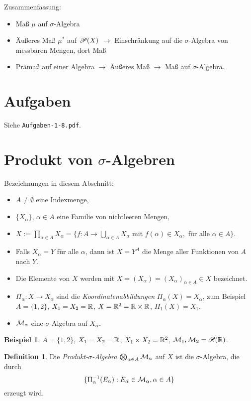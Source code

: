 \documentclass[
 a4paper,
 12pt,
 parskip=half
 ]{scrreprt}
\theoremstyle{plain}
\theoremstyle{definition}
\newtheorem{defn}[thm]{Definition}
\newtheorem*{exmp*}{Beispiel}
\numberwithin{equation}{section}
\begin{document}
Zusammenfassung:
\begin{itemize}
 \item Maß $\mu$ auf $\sigma$-Algebra
 \item Äußeres Maß $\mu^*$ auf $\mathscr{P}(X)$ $\rightarrow$ Einschränkung auf die $\sigma$-Algebra von messbaren Mengen, dort Maß 
 \item Prämaß auf einer Algebra $\rightarrow$ Äußeres Maß $\rightarrow$ Maß auf $\sigma$-Algebra.
\end{itemize}

\section{Aufgaben}
Siehe \verb+Aufgaben-1-8.pdf+.

\section{Produkt von \texorpdfstring{$\sigma$}{Sigma}-Algebren}
Bezeichnungen in diesem Abschnitt:
\begin{itemize}
 \item $A \ne \emptyset$ eine Indexmenge,
 \item $\{ X_\alpha \}$, $\alpha \in A$ eine Familie von nichtleeren Mengen,
 \item $X := \prod_{\alpha \in A} X_\alpha = \{ f:A \to \bigcup_{\alpha \in A} X_\alpha$ mit $f( \alpha ) \in X_\alpha,$ für alle $\alpha \in A \}$.
 \item Falls $X_\alpha = Y$ für alle $\alpha$, dann ist $X = Y^A$ die Menge aller Funktionen von $A$ nach $Y$.
 \item Die Elemente von $X$ werden mit $X = (X_\alpha) = (X_\alpha)_{\alpha \in A} \in X$ bezeichnet.
 \item $\Pi_\alpha : X \to X_\alpha$ sind die \emph{Koordinatenabbildungen} $\Pi_\alpha(X) = X_\alpha$, zum Beispiel $A = \{ 1, 2 \}$, $X_1 = X_2 = \mathbb{R}$, $X = \mathbb{R}^2 = \mathbb{R} \times \mathbb{R}$, $\Pi_1(X) = X_1$.
 \item $\mathcal{M}_\alpha$ eine $\sigma$-Algebra auf $X_\alpha$.
\end{itemize}

\begin{exmp*}
 $A = \{ 1,2 \}$, $X_1 = X_2 = \mathbb{R}$, $X_1 \times X_2 = \mathbb{R}^2$, $\mathcal{M}_1, \mathcal{M}_2 = \mathscr{B}( \mathbb{R} )$.
\end{exmp*}

\begin{defn}
 Die \emph{Produkt-$\sigma$-Algebra} $\bigotimes_{\alpha \in A} \mathcal{M}_\alpha$ auf $X$ ist die $\sigma$-Algebra, die durch
 \[ \{ \Pi_\alpha^{-1}( E_\alpha ) : E_\alpha \in \mathcal{M}_\alpha, \alpha \in A \} \]
 erzeugt wird.
\end{defn}
\end{document}
